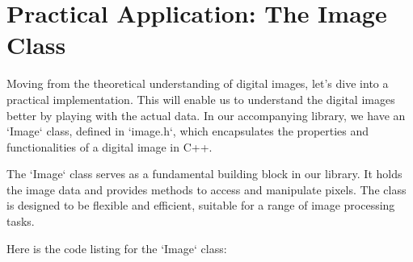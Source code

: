 \documentclass[11pt]{book}
\begin{document}
\section{Practical Application: The Image Class}


Moving from the theoretical understanding of digital images, let's dive into a practical implementation. This will enable us to understand the digital images better by playing with the actual data. In our accompanying library, we have an `Image` class, defined in `image.h`, which encapsulates the properties and functionalities of a digital image in C++. 

The `Image` class serves as a fundamental building block in our library. It holds the image data and provides methods to access and manipulate pixels. The class is designed to be flexible and efficient, suitable for a range of image processing tasks.

Here is the code listing for the `Image` class:
\end{document}
